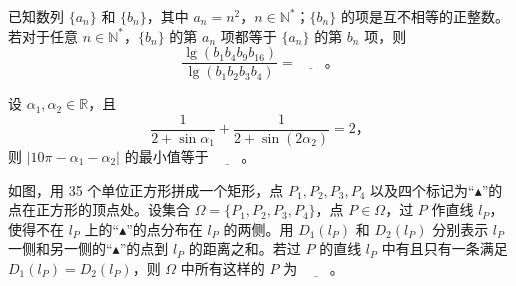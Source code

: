 \begin{question}
已知数列 $\{a_n\}$ 和 $\{b_n\}$，其中 $a_n=n^2$，$n\in\mathbb N^*$；$\{b_n\}$ 的项是互不相等的正整数。若对于任意 $n\in\mathbb N^*$，$\{b_n\}$ 的第 $a_n$ 项都等于 $\{a_n\}$ 的第 $b_n$ 项，则
\nopagebreak[4]
\[
\dfrac{\lg(b_1b_4b_9b_{16})}{\lg(b_1b_2b_3b_4)}=\underline{\qquad}\text{。}
\]

\end{question}
\begin{question}
设 $\alpha_1,\alpha_2\in\mathbb R$，且
\nopagebreak[4]
\[
\dfrac{1}{2+\sin\alpha_1}+\dfrac{1}{2+\sin(2\alpha_2)}=2\text{，}
\]
则 $|10\pi-\alpha_1-\alpha_2|$ 的最小值等于 $\underline{\qquad}$。

\Needspace{0.4\textheight}
\end{question}
\begin{question}
如图，用 35 个单位正方形拼成一个矩形，点 $P_1,P_2,P_3,P_4$ 以及四个标记为“$\blacktriangle$”的点在正方形的顶点处。设集合 $\Omega=\{P_1,P_2,P_3,P_4\}$，点 $P\in\Omega$，过 $P$ 作直线 $l_P$，使得不在 $l_P$ 上的“$\blacktriangle$”的点分布在 $l_P$ 的两侧。用 $D_1(l_P)$ 和 $D_2(l_P)$ 分别表示 $l_P$ 一侧和另一侧的“$\blacktriangle$”的点到 $l_P$ 的距离之和。若过 $P$ 的直线 $l_P$ 中有且只有一条满足 $D_1(l_P)=D_2(l_P)$，则 $\Omega$ 中所有这样的 $P$ 为 $\underline{\qquad}$。
\nopagebreak[4]
\begin{center}\end{center}
\nopagebreak[4]
\end{question}

